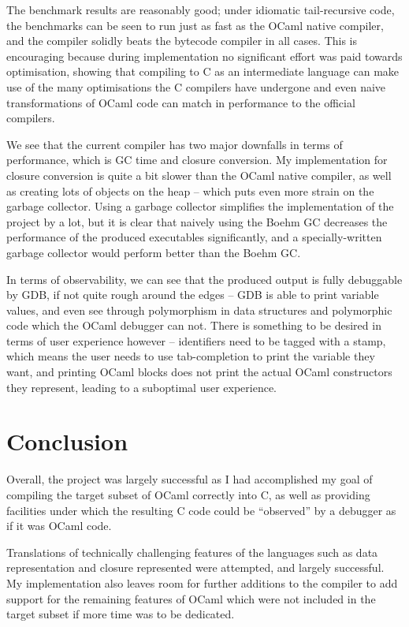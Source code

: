 The benchmark results are reasonably good; under idiomatic tail-recursive code,
the benchmarks can be seen to run just as fast as the OCaml native compiler, and
the compiler solidly beats the bytecode compiler in all cases. This is
encouraging because during implementation no significant effort was paid towards
optimisation, showing that compiling to C as an intermediate language can make
use of the many optimisations the C compilers have undergone and even naive
transformations of OCaml code can match in performance to the official
compilers.

We see that the current compiler has two major downfalls in terms of
performance, which is GC time and closure conversion. My implementation for
closure conversion is quite a bit slower than the OCaml native compiler, as well
as creating lots of objects on the heap -- which puts even more strain on the
garbage collector. Using a garbage collector simplifies the implementation of
the project by a lot, but it is clear that naively using the Boehm GC decreases
the performance of the produced executables significantly, and a
specially-written garbage collector would perform better than the Boehm GC.

In terms of observability, we can see that the produced output is fully
debuggable by GDB, if not quite rough around the edges -- GDB is able to print
variable values, and even see through polymorphism in data structures and
polymorphic code which the OCaml debugger can not. There is something to be
desired in terms of user experience however -- identifiers need to be tagged
with a stamp, which means the user needs to use tab-completion to print the
variable they want, and printing OCaml blocks does not print the actual OCaml
constructors they represent, leading to a suboptimal user experience.
    
\chapter{Conclusion}

Overall, the project was largely successful as I had accomplished my goal of 
compiling the target subset of OCaml correctly into C, as well as providing 
facilities under which the resulting C code could be ``observed'' by a debugger 
as if it was OCaml code.

Translations of technically challenging features of the languages such as data 
representation and closure represented were attempted, and largely successful. 
My implementation also leaves room for further additions to the compiler to add 
support for the remaining features of OCaml which were not included in the 
target subset if more time was to be dedicated.

